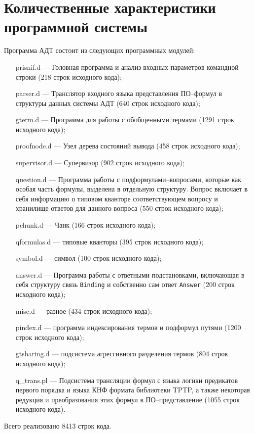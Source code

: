 \section{Количественные характеристики программной системы}
Программа АДТ состоит из следующих программных модулей:
\begin{enumerate}
\item[prisnif.d] --- Головная программа и анализ входных параметров командной строки (218 строк исходного кода);
\item[parser.d] --- Транслятор входного языка представления ПО--формул в структуры данных системы АДТ (640 строк исходного кода);
\item[gterm.d] --- Программа для работы с обобщенными термами (1291 строк исходного кода);
\item[proofnode.d] --- Узел дерева состояний вывода (458 строк исходного кода);
\item[supervisor.d] --- Супервизор (902 строк исходного кода);
\item[question.d] --- Программа работы с подформулами--вопросами, которые как особая часть формулы, выделена в отдельную структуру. Вопрос включает в себя информацию о типовом кванторе соответствующем вопросу и хранилище ответов для данного вопроса (550 строк исходного кода);
\item[pchunk.d] --- Чанк (166 строк исходного кода);
\item[qformulas.d] --- типовые кванторы (395 строк исходного кода);
\item[symbol.d] --- символ (100 строк исходного кода);
\item[answer.d] --- Программа работы с ответными подстановками, включающая в себя структуру связь \texttt{Binding} и собственно сам ответ \texttt{Answer} (200 строк исходного кода);
\item[misc.d] --- разное (434 строк исходного кода);
\item[pindex.d] --- программа индексирования термов и подформул путями (1200 строк исходного кода);
\item[gtsharing.d] --- подсистема агрессивного разделения термов (804 строк исходного кода);
\item[q\_trans.pl] --- Подсистема трансляции формул с языка логики предикатов первого порядка и языка КНФ формата библиотеки TPTP, а также некоторая редукция и преобразования этих формул в ПО--представление (1055 строк исходного кода).
\end{enumerate}
Всего реализовано 8413 строк кода.




